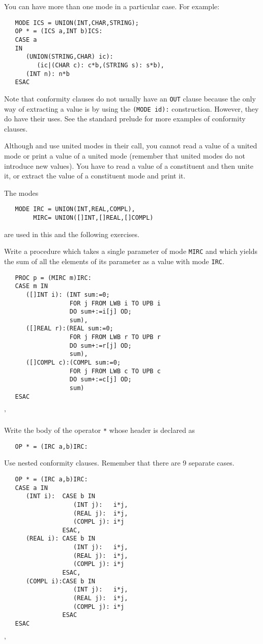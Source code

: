 You can have more than one mode in a particular case. For example:
\begin{verbatim}
   MODE ICS = UNION(INT,CHAR,STRING);
   OP * = (ICS a,INT b)ICS:
   CASE a
   IN
      (UNION(STRING,CHAR) ic):
         (ic|(CHAR c): c*b,(STRING s): s*b),
      (INT n): n*b
   ESAC
\end{verbatim}
\noindent
Note that conformity clauses do not usually have an \verb|OUT| clause
because the only way of extracting a value is by using the
\verb|(MODE id):| construction. However, they do have their uses. See
the standard prelude for more examples of conformity clauses.

Although  and  use united modes in their call,
you cannot read a value of a united mode or print a value of a united
mode (remember that united modes do not introduce new values). You
have to read a value of a constituent 
and then unite it, or extract the value of a constituent mode and
print it.

\begin{exercise}
\item The modes
\begin{verbatim}
   MODE IRC = UNION(INT,REAL,COMPL),
        MIRC= UNION([]INT,[]REAL,[]COMPL)
\end{verbatim}
\noindent
are used in this and the following exercises.

Write a procedure which takes a single parameter of mode \verb|MIRC|
and which yields the sum of all the elements of its parameter as a
value with mode \verb|IRC|.
\ans \ %
\begin{verbatim}
   PROC p = (MIRC m)IRC:
   CASE m IN
      ([]INT i): (INT sum:=0;
                  FOR j FROM LWB i TO UPB i
                  DO sum+:=i[j] OD;
                  sum),
      ([]REAL r):(REAL sum:=0;
                  FOR j FROM LWB r TO UPB r
                  DO sum+:=r[j] OD;
                  sum),
      ([]COMPL c):(COMPL sum:=0;
                  FOR j FROM LWB c TO UPB c
                  DO sum+:=c[j] OD;
                  sum)
   ESAC
\end{verbatim}
'
\item Write the body of the operator \verb|*| whose header is
declared as
\begin{verbatim}
   OP * = (IRC a,b)IRC:
\end{verbatim}
\noindent
Use nested conformity clauses. Remember that there are 9 separate
cases. \ans \ %
\begin{verbatim}
   OP * = (IRC a,b)IRC:
   CASE a IN
      (INT i):  CASE b IN
                   (INT j):   i*j,
                   (REAL j):  i*j,
                   (COMPL j): i*j
                ESAC,
      (REAL i): CASE b IN
                   (INT j):   i*j,
                   (REAL j):  i*j,
                   (COMPL j): i*j
                ESAC,
      (COMPL i):CASE b IN
                   (INT j):   i*j,
                   (REAL j):  i*j,
                   (COMPL j): i*j
                ESAC
   ESAC
\end{verbatim}
'
\end{exercise}


